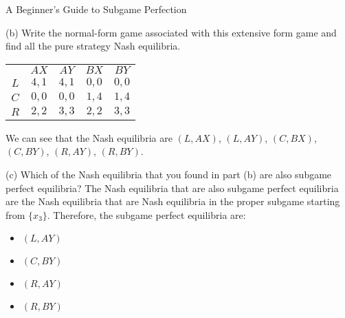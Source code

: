 \documentclass[10pt]{extarticle}
\begin{document}
\begin{problem}{A Beginner's Guide to Subgame Perfection}
    \begin{problem}{(b)}
      Write the normal-form game associated with this extensive form game and find all the pure strategy Nash equilibria.
      \tcblower
      \begin{center}
        \begin{tabular}{c|c|c|c|c|}
          \multicolumn{1}{c}{}& \multicolumn{1}{c}{$AX$}& \multicolumn{1}{c}{$AY$}& \multicolumn{1}{c}{$BX$}& \multicolumn{1}{c}{$BY$}\\
          \cline{2-5}
          $L$ & $4,1$ & $4,1$ & $0,0$ & $0,0$\\
          $C$ & $0,0$ & $0,0$ & $1,4$ & $1,4$\\
          $R$ & $2,2$ & $3,3$ & $2,2$ & $3,3$\\
          \cline{2-5}
        \end{tabular}
      \end{center}
      We can see that the Nash equilibria are $(L,AX)$, $(L,AY)$, $(C, BX)$, $(C, BY)$, $(R,AY)$, $(R, BY)$.
    \end{problem}
    \begin{problem}{(c)}
      Which of the Nash equilibria that you found in part (b) are also subgame perfect equilibria?
      \tcblower
      The Nash equilibria that are also subgame perfect equilibria are the Nash equilibria that are Nash equilibria in the proper subgame starting from $\{x_3\}$. Therefore, the subgame perfect equilibria are:
      \begin{itemize}
        \item $(L, AY)$
        \item $(C, BY)$
        \item $(R, AY)$
        \item $(R, BY)$
      \end{itemize}
    \end{problem}
  \end{problem}
\end{document}

